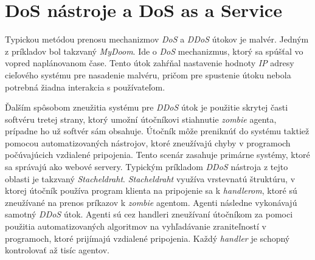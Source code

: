 \documentclass[
  digital, %
  table,   %
  lof,     %
  nolot,   %
  nocover
]{fithesis3}
\begin{document}


\section{DoS nástroje a DoS as a Service}
Typickou metódou prenosu mechanizmov \textit{DoS} a \textit{DDoS} útokov je malvér. Jedným z príkladov 
bol
takzvaný \textit{MyDoom}. Ide o \textit{DoS} mechanizmus, ktorý sa spúšťal vo vopred naplánovanom čase.
Tento útok zahŕňal nastavenie hodnoty \textit{IP} adresy cieľového systému pre nasadenie malvéru,
pričom pre spustenie útoku nebola potrebná žiadna interakcia s používateľom.

Ďalším spôsobom zneužitia systému pre \textit{DDoS} útok je použitie skrytej časti softvéru tretej
strany, ktorý umožní útočníkovi stiahnutie \textit{zombie} agenta, prípadne ho už softvér sám obsahuje.
Útočník môže preniknúť do systému taktiež pomocou automatizovaných nástrojov, ktoré zneužívajú chyby v
programoch počúvajúcich vzdialené pripojenia. Tento scenár zasahuje primárne systémy, ktoré sa správajú
ako webové servery. Typickým príkladom \textit{DDoS} nástroja z tejto oblasti je takzvaný
\textit{Stacheldraht}. \textit{Stacheldraht} využíva vrstevnatú štruktúru, v ktorej útočník používa
program klienta na pripojenie sa k \textit{handlerom}, ktoré sú zneužívané na prenos príkazov
k \textit{zombie} agentom. Agenti následne vykonávajú samotný \textit{DDoS} útok. Agenti sú cez 
handleri
zneužívaní útočníkom za pomoci použitia automatizovaných algoritmov na vyhľadávanie zraniteľností v
programoch, ktoré prijímajú vzdialené pripojenia. Každý \textit{handler} je schopný kontrolovať až 
tisíc
agentov. 
\end{document}
